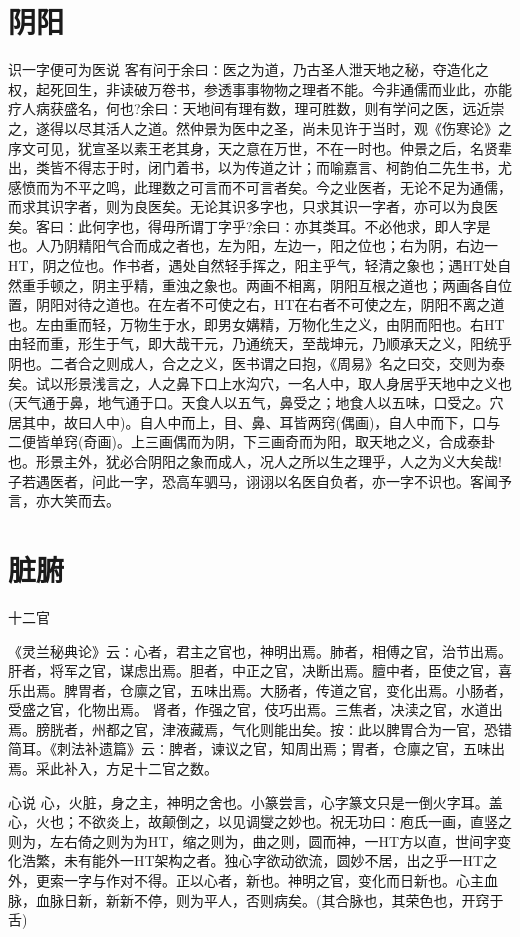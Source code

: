 \documentclass[a4paper,12pt,UTF8,twoside]{ctexbook}
\begin{document}
	\chapter{阴阳}
    识一字便可为医说	
	客有问于余曰∶医之为道，乃古圣人泄天地之秘，夺造化之权，起死回生，非读破万卷书，参透事事物物之理者不能。今非通儒而业此，亦能疗人病获盛名，何也?余曰∶天地间有理有数，理可胜数，则有学问之医，远近崇之，遂得以尽其活人之道。然仲景为医中之圣，尚未见许于当时，观《伤寒论》之序文可见，犹宣圣以素王老其身，天之意在万世，不在一时也。仲景之后，名贤辈出，类皆不得志于时，闭门着书，以为传道之计；而喻嘉言、柯韵伯二先生书，尤感愤而为不平之鸣，此理数之可言而不可言者矣。今之业医者，无论不足为通儒，而求其识字者，则为良医矣。无论其识多字也，只求其识一字者，亦可以为良医矣。客曰∶此何字也，得毋所谓丁字乎?余曰∶亦其类耳。不必他求，即人字是也。人乃阴精阳气合而成之者也，左为阳，左边一，阳之位也；右为阴，右边一HT，阴之位也。作书者，遇处自然轻手挥之，阳主乎气，轻清之象也；遇HT处自然重手顿之，阴主乎精，重浊之象也。两画不相离，阴阳互根之道也；两画各自位置，阴阳对待之道也。在左者不可使之右，HT在右者不可使之左，阴阳不离之道也。左由重而轻，万物生于水，即男女媾精，万物化生之义，由阴而阳也。右HT由轻而重，形生于气，即大哉干元，乃通统天，至哉坤元，乃顺承天之义，阳统乎阴也。二者合之则成人，合之之义，医书谓之曰抱，《周易》名之曰交，交则为泰矣。试以形景浅言之，人之鼻下口上水沟穴，一名人中，取人身居乎天地中之义也(天气通于鼻，地气通于口。天食人以五气，鼻受之；地食人以五味，口受之。穴居其中，故曰人中)。自人中而上，目、鼻、耳皆两窍(偶画)，自人中而下，口与二便皆单窍(奇画)。上三画偶而为阴，下三画奇而为阳，取天地之义，合成泰卦也。形景主外，犹必合阴阳之象而成人，况人之所以生之理乎，人之为义大矣哉!子若遇医者，问此一字，恐高车驷马，诩诩以名医自负者，亦一字不识也。客闻予言，亦大笑而去。

	\chapter{脏腑}
	十二官
  
	《灵兰秘典论》云∶心者，君主之官也，神明出焉。肺者，相傅之官，治节出焉。肝者，将军之官，谋虑出焉。胆者，中正之官，决断出焉。膻中者，臣使之官，喜乐出焉。脾胃者，仓廪之官，五味出焉。大肠者，传道之官，变化出焉。小肠者，受盛之官，化物出焉。
	肾者，作强之官，伎巧出焉。三焦者，决渎之官，水道出焉。膀胱者，州都之官，津液藏焉，气化则能出矣。按∶此以脾胃合为一官，恐错简耳。《刺法补遗篇》云∶脾者，谏议之官，知周出焉；胃者，仓廪之官，五味出焉。采此补入，方足十二官之数。
		
	心说
	心，火脏，身之主，神明之舍也。小篆尝言，心字篆文只是一倒火字耳。盖心，火也；不欲炎上，故颠倒之，以见调燮之妙也。祝无功曰∶庖氏一画，直竖之则为，左右倚之则为为HT，缩之则为，曲之则，圆而神，一HT方以直，世间字变化浩繁，未有能外一HT架构之者。独心字欲动欲流，圆妙不居，出之乎一HT之外，更索一字与作对不得。正以心者，新也。神明之官，变化而日新也。心主血脉，血脉日新，新新不停，则为平人，否则病矣。(其合脉也，其荣色也，开窍于舌)
	
\end{document}
